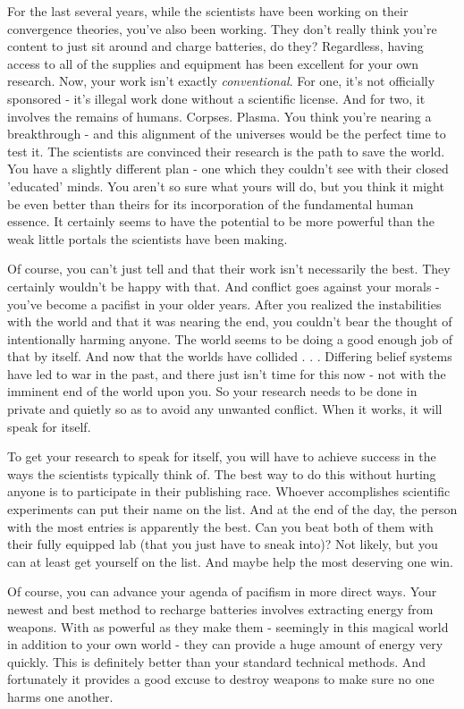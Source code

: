 \documentclass[char]{guildcamp3}
\begin{document}
For the last several years, while the scientists have been working on their convergence theories, you've also been working.  They don't really think you're content to just sit around and charge batteries, do they? Regardless, having access to all of the supplies and equipment has been excellent for your own research. Now, your work isn't exactly \emph{conventional}. For one, it's not officially sponsored - it's illegal work done without a scientific license. And for two, it involves the remains of humans. Corpses. Plasma. You think you're nearing a breakthrough - and this alignment of the universes would be the perfect time to test it. The scientists are convinced their research is the path to save the world. You have a slightly different plan - one which they couldn't see with their closed 'educated' minds. You aren't so sure what yours will do, but you think it might be even better than theirs for its incorporation of the fundamental human essence. It certainly seems to have the potential to be more powerful than the weak little portals the scientists have been making. 

Of course, you can't just tell \cSciOne{\informal} and \cSciTwo{\informal} that their work isn't necessarily the best. They certainly wouldn't be happy with that. And conflict goes against your morals - you've become a pacifist in your older years. After you realized the instabilities with the world and that it was nearing the end, you couldn't bear the thought of intentionally harming anyone. The world seems to be doing a good enough job of that by itself. And now that the worlds have collided . . . Differing belief systems have led to war in the past, and there just isn't time for this now - not with the imminent end of the world upon you. So your research needs to be done in private and quietly so as to avoid any unwanted conflict. When it works, it will speak for itself. 

To get your research to speak for itself, you will have to achieve success in the ways the scientists typically think of. The best way to do this without hurting anyone is to participate in their publishing race. Whoever accomplishes scientific experiments can put their name on the list. And at the end of the day, the person with the most entries is apparently the best. Can you beat both of them with their fully equipped lab (that you just have to sneak into)? Not likely, but you can at least get yourself on the list. And maybe help the most deserving one win.

Of course, you can advance your agenda of pacifism in more direct ways. Your newest and best method to recharge batteries involves extracting energy from weapons. With as powerful as they make them - seemingly in this magical world in addition to your own world - they can provide a huge amount of energy very quickly. This is definitely better than your standard technical methods. And fortunately it provides a good excuse to destroy weapons to make sure no one harms one another.
\end{document}

